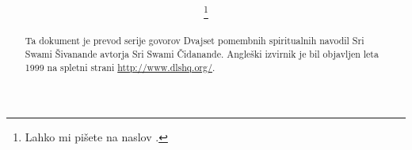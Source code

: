 \documentclass[12pt,a4paper]{article}
\title{
	\vspace{-15mm}
	\fontsize{24pt}{10pt}\textbf{\naslov}	%
}
\author{
\large
\textsc{\avtor}\thanks{Lahko mi pišete na naslov \avtorEmail.}
}
\date{}
\begin{document}
\maketitle %
\thispagestyle{fancy} %

\begin{abstract}
    \noindent Ta dokument je prevod serije govorov Dvajset pomembnih spiritualnih navodil Sri Swami Šivanande avtorja Sri Swami Čidanande. Angleški izvirnik je bil objavljen leta 1999 na spletni strani \url{http://www.dlshq.org/}.
\end{abstract}



\tableofcontents

\newpage

%

%



%
%


\end{document}

